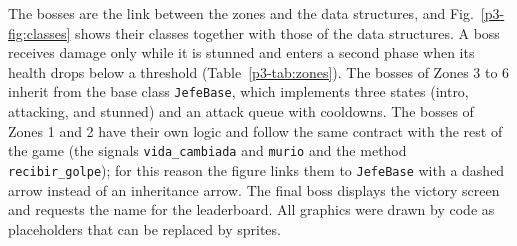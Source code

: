\documentclass[conference]{IEEEtran}
\begin{document}
The bosses are the link between the zones and the data structures, and Fig.~\ref{p3-fig:classes} shows their classes together with those of the data structures. A boss receives damage only while it is stunned and enters a second phase when its health drops below a threshold (Table~\ref{p3-tab:zones}). The bosses of Zones 3 to 6 inherit from the base class \texttt{JefeBase}, which implements three states (intro, attacking, and stunned) and an attack queue with cooldowns. The bosses of Zones 1 and 2 have their own logic and follow the same contract with the rest of the game (the signals \texttt{vida\_cambiada} and \texttt{murio} and the method \texttt{recibir\_golpe}); for this reason the figure links them to \texttt{JefeBase} with a dashed arrow instead of an inheritance arrow. The final boss displays the victory screen and requests the name for the leaderboard. All graphics were drawn by code as placeholders that can be replaced by sprites.
\end{document}
